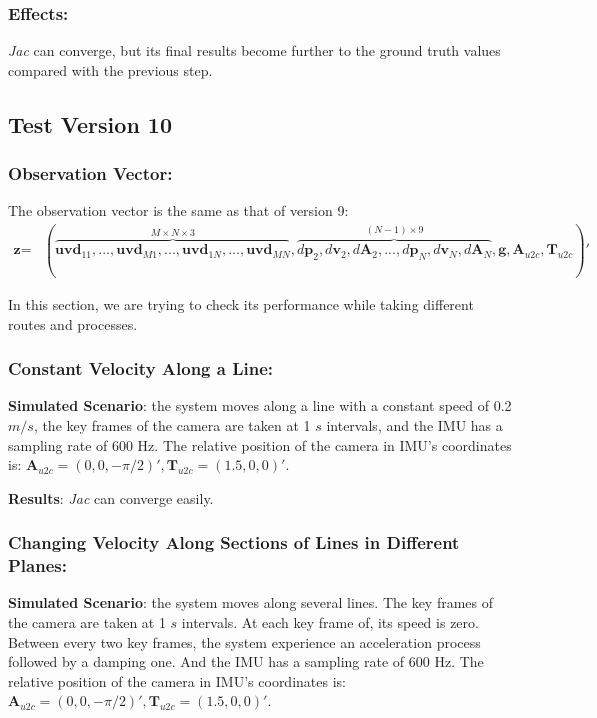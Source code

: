 \documentclass[12pt]{article}   %
\begin{document}
\subsubsection{Effects:}

\textit{Jac} can converge, but its final results become further to the ground truth values compared with the previous step.

\subsection{Test Version 10}
\subsubsection{Observation Vector:}

The observation vector is the same as that of version 9: 
\begin{align*}
\textbf{z}=&(\overbrace{\textbf{uvd}_{11}, ... , \textbf{uvd}_{M1}, ..., \textbf{uvd}_{1N}, ... , \textbf{uvd}_{MN}}^{M \times N \times 3}, \overbrace{d\textbf{p}_2, d\textbf{v}_2, d\textbf{A}_2, ..., d\textbf{p}_N, d\textbf{v}_N, d\textbf{A}_N}^{(N-1) \times 9}, \textbf{g}, \textbf{A}_{u2c}, \textbf{T}_{u2c})'
\end{align*}

In this section, we are trying to check its performance while taking different routes and processes.

\subsubsection{Constant Velocity Along a Line:}

\textbf{Simulated Scenario}: the system moves along a line with a constant speed of 0.2 $m/s$, the key frames of the camera are taken at 1 $s$ intervals, and the IMU has a sampling rate of 600 Hz. The relative position of the camera in IMU's coordinates is: $\textbf{A}_{u2c} = (0, 0, -\pi/2)', \textbf{T}_{u2c} = (1.5, 0, 0)'$.

\medskip
\noindent\textbf{Results}: \textit{Jac} can converge easily.


\subsubsection{Changing Velocity Along Sections of Lines in Different Planes:}

\textbf{Simulated Scenario}: the system moves along several lines. The key frames of the camera are taken at 1 $s$ intervals. At each key frame of, its speed is zero. Between every two key frames, the system experience an acceleration process followed by a damping one. And the IMU has a sampling rate of 600 Hz. The relative position of the camera in IMU's coordinates is: $\textbf{A}_{u2c} = (0, 0, -\pi/2)', \textbf{T}_{u2c} = (1.5, 0, 0)'$.
\end{document}
